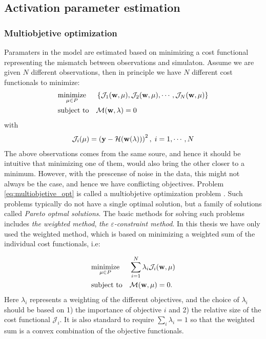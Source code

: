 \subsection{Activation parameter estimation}



\subsubsection{Multiobjetive optimization}
Paramaters in the model are estimated based on minimizing a cost
functional representing the mismatch between observations and simulaton.
Assume we are given $N$ different observations, then in principle we
have $N$ different cost functionals to minimize:
\begin{equation}
  \begin{aligned}
    \label{eq:multiobjetive_opt}
    & \underset{\mu \in P}{\text{minimize}}
    & &  \left\{ \mathcal{J}_1(\mathbf{w}, \mu), \mathcal{J}_2(\mathbf{w}, \mu), \cdots, \mathcal{J}_N(\mathbf{w}, \mu) \right\} \\
    & \text{subject to}
    & &\mathcal{M}(\mathbf{w}, \lambda) = 0
  \end{aligned}
\end{equation}
with
\begin{align}
  \mathcal{J}_i(\mu) = \left( \mathbf{y} - \mathcal{H}(\mathbf{w}(\lambda)) \right)^2, \; i = 1,\cdots, N
\end{align}
The above observations comes from the same soure, and hence it should
be intuitive that minimizing one of them, would also bring the other
closer to a minimum. However, with the prescense of noise in the data,
this might not always be the case, and hence we have conflicting
objectives. Problem \eqref{eq:multiobjetive_opt} is called a
multiobjetive optimization problem \cite{deb2016multi}. Such problems
typically do not have a single optimal solution, but a family of
solutions called \emph{Pareto optmal solutions}. The basic methods for
solving such problems includes \emph{the weighted method}, \emph{the
  $\varepsilon$-constraint method}. In this thesis we have only used
the weighted method, which is based on minimizing a weighted sum of
the individual cost functionals, i.e:

\begin{equation}
  \begin{aligned}
    \label{eq:multiobjetive_opt}
    & \underset{\mu \in P}{\text{minimize}}
    & &  \sum_{i=1}^N \lambda_i \mathcal{J}_i(\mathbf{w}, \mu) \\
    & \text{subject to}
    & &\mathcal{M}(\mathbf{w}, \mu) = 0.
  \end{aligned}
\end{equation}
Here $\lambda_i$ represents a weighting of the different objectives,
and the choice of $\lambda_i$ should be based on 1) the importance of
objective $i$ and 2) the relative size of the cost functional
$\mathcal{J}_i$. It is also standard to require $\sum_i \lambda_i = 1$
so that the weighted sum is a convex combination of the objective
functionals. 


